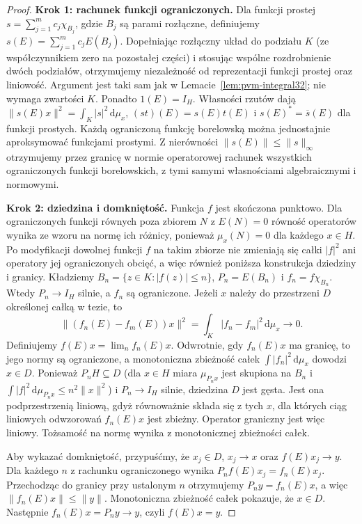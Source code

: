 \begin{proof}
\textbf{Krok 1: rachunek funkcji ograniczonych.}
Dla funkcji prostej $s=\sum_{j=1}^m c_j\chi_{B_j}$, gdzie
$B_j$ są parami rozłączne, definiujemy
$s(E)=\sum_{j=1}^m c_jE(B_j)$.
Dopełniając rozłączny układ do podziału $K$ (ze współczynnikiem
zero na pozostałej części) i stosując wspólne rozdrobnienie
dwóch podziałów, otrzymujemy niezależność od reprezentacji
funkcji prostej oraz liniowość. Argument jest taki sam jak
w Lemacie~\ref{lem:pvm-integral32}; nie wymaga zwartości $K$.
Ponadto $1(E)=I_H$. Własności rzutów dają
$\|s(E)x\|^2=\int_K|s|^2\,\mathrm d\mu_x$,
$(st)(E)=s(E)t(E)$ i $s(E)^*=\overline s(E)$
dla funkcji prostych. Każdą ograniczoną funkcję borelowską
można jednostajnie aproksymować funkcjami prostymi.
Z nierówności $\|s(E)\|\le\|s\|_\infty$ otrzymujemy
przez granicę w normie operatorowej rachunek wszystkich
ograniczonych funkcji borelowskich, z tymi samymi
własnościami algebraicznymi i normowymi.

\textbf{Krok 2: dziedzina i domkniętość.}
Funkcja $f$ jest skończona punktowo. Dla ograniczonych
funkcji równych poza zbiorem $N$ z $E(N)=0$ równość operatorów
wynika ze wzoru na normę ich różnicy, ponieważ $\mu_x(N)=0$
dla każdego $x\in H$. Po modyfikacji dowolnej funkcji $f$ na
takim zbiorze nie zmieniają się całki $|f|^2$ ani operatory
jej ograniczonych obcięć, a więc również poniższa konstrukcja
dziedziny i granicy.
Kładziemy $B_n=\{z\in K:|f(z)|\le n\}$,
$P_n=E(B_n)$ i $f_n=f\chi_{B_n}$.
Wtedy $P_n\to I_H$ silnie, a $f_n$ są ograniczone.
Jeżeli $x$ należy do przestrzeni $D$ określonej całką w tezie,
to
\[
 \|(f_n(E)-f_m(E))x\|^2
 =\int_K|f_n-f_m|^2\,\mathrm d\mu_x\longrightarrow0.
\]
Definiujemy $f(E)x=\lim_n f_n(E)x$.
Odwrotnie, gdy $f_n(E)x$ ma granicę, to jego normy są
ograniczone, a monotoniczna zbieżność całek
$\int|f_n|^2\,\mathrm d\mu_x$ dowodzi $x\in D$.
Ponieważ $P_nH\subseteq D$ (dla $x\in H$ miara $\mu_{P_nx}$
jest skupiona na $B_n$ i $\int|f|^2\,\mathrm d\mu_{P_nx}\le n^2\|x\|^2$)
i $P_n\to I_H$ silnie, dziedzina $D$ jest gęsta.
Jest ona podprzestrzenią liniową, gdyż równoważnie składa się
z tych $x$, dla których ciąg liniowych odwzorowań $f_n(E)x$
jest zbieżny. Operator graniczny jest więc liniowy.
Tożsamość na normę wynika
z monotonicznej zbieżności całek.

Aby wykazać domkniętość, przypuśćmy, że $x_j\in D$,
$x_j\to x$ oraz $f(E)x_j\to y$. Dla każdego $n$
z rachunku ograniczonego wynika
$P_nf(E)x_j=f_n(E)x_j$.
Przechodząc do granicy przy ustalonym $n$ otrzymujemy
$P_ny=f_n(E)x$, a więc $\|f_n(E)x\|\le\|y\|$.
Monotoniczna zbieżność całek pokazuje, że $x\in D$.
Następnie $f_n(E)x=P_ny\to y$, czyli $f(E)x=y$.


\end{proof}
